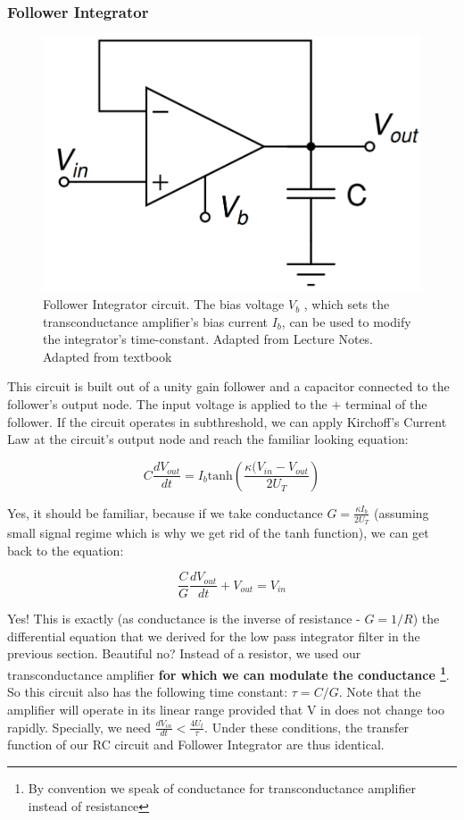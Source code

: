\subsubsection{Follower Integrator} 

\begin{figure}[H]
    \centering
    \includegraphics[width=0.5\linewidth]{../../Figures/Follower Integrator.PNG}
    \caption{Follower Integrator circuit. The bias voltage $V_b$ , which sets the transconductance amplifier’s bias current $I_b$, can be used to modify the integrator’s time-constant. Adapted from Lecture Notes. Adapted from textbook}
    \label{fig:Follower_Integrator}
\end{figure}

This circuit is built out of a unity gain follower and a capacitor connected to the follower's output node. The input voltage is applied to the $+$ terminal of the follower. If the circuit operates in subthreshold, we can apply Kirchoff's Current Law at the circuit's output node and reach the familiar looking equation: 

\begin{equation}
    C \frac{dV_{out}}{dt} = I_b \mathrm{tanh}(\frac{\kappa (V_{in} - V_{out}}{2 U_T})
\end{equation}

Yes, it should be familiar, because if we take conductance $G = \frac{\kappa I_b}{2 U_T}$ (assuming small signal regime which is why we get rid of the tanh function), we can get back to the equation: 

\begin{equation}
    \frac{C}{G} \frac{dV_{out}}{dt} + V_{out} = V_{in}
\end{equation}

Yes! This is exactly (as conductance is the inverse of resistance - $G = 1/R$) the differential equation that we derived for the low pass integrator filter in the previous section. Beautiful no? Instead of a resistor, we used our transconductance amplifier \textbf{for which we can modulate the conductance \footnote{By convention we speak of conductance for transconductance amplifier instead of resistance}}. So this circuit also has the following time constant: $\tau = C/G$. Note that the amplifier will operate in its linear range provided that V in does not change
too rapidly. Specially, we need $\frac{dV_{in}}{dt} < \frac{4U_t}{\tau}$. Under these conditions, the transfer function of our RC circuit and Follower Integrator are thus identical. 

